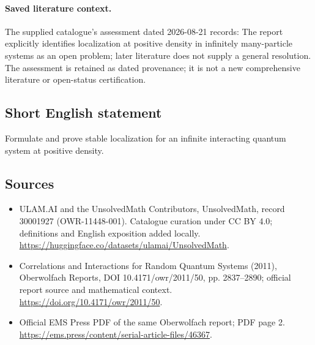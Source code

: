 \documentclass[11pt]{article}
\begin{document}
\paragraph{Saved literature context.} The supplied catalogue's assessment dated 2026-08-21 records: The report explicitly identifies localization at positive density in infinitely many-particle systems as an open problem; later literature does not supply a general resolution. The assessment is retained as dated provenance; it is not a new comprehensive literature or open-status certification.
\subsection{Short English statement}
Formulate and prove stable localization for an infinite interacting quantum system at positive density.
\subsection{Sources}
\begin{itemize}
\item[\hypertarget{source:30001927:1}{S1}] ULAM.AI and the UnsolvedMath Contributors, UnsolvedMath, record 30001927 (OWR-11448-001). Catalogue curation under CC BY 4.0; definitions and English exposition added locally.
\url{https://huggingface.co/datasets/ulamai/UnsolvedMath}.
\item[\hypertarget{source:30001927:2}{S2}] Correlations and Interactions for Random Quantum Systems (2011), Oberwolfach Reports, DOI 10.4171/owr/2011/50, pp. 2837--2890; official report source and mathematical context.
\url{https://doi.org/10.4171/owr/2011/50}.
\item[\hypertarget{source:30001927:3}{S3}] Official EMS Press PDF of the same Oberwolfach report; PDF page 2.
\url{https://ems.press/content/serial-article-files/46367}.
\end{itemize}
\label{end:30001927}
\end{document}
